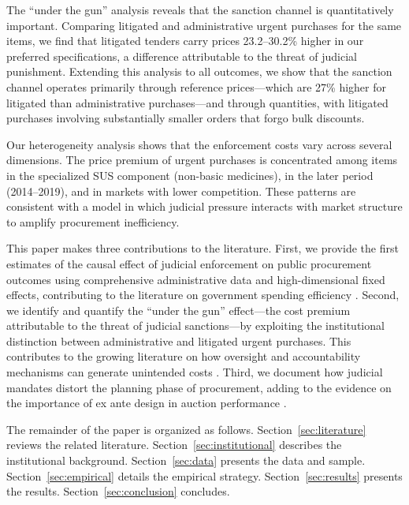 The ``under the gun'' analysis reveals that the sanction channel is quantitatively important. Comparing litigated and administrative urgent purchases for the same items, we find that litigated tenders carry prices 23.2--30.2\% higher in our preferred specifications, a difference attributable to the threat of judicial punishment. Extending this analysis to all outcomes, we show that the sanction channel operates primarily through reference prices---which are 27\% higher for litigated than administrative purchases---and through quantities, with litigated purchases involving substantially smaller orders that forgo bulk discounts.

Our heterogeneity analysis shows that the enforcement costs vary across several dimensions. The price premium of urgent purchases is concentrated among items in the specialized SUS component (non-basic medicines), in the later period (2014--2019), and in markets with lower competition. These patterns are consistent with a model in which judicial pressure interacts with market structure to amplify procurement inefficiency.

This paper makes three contributions to the literature. First, we provide the first estimates of the causal effect of judicial enforcement on public procurement outcomes using comprehensive administrative data and high-dimensional fixed effects, contributing to the literature on government spending efficiency \citep{bandiera2009active, best2023procurement, decarolis2018buyer}. Second, we identify and quantify the ``under the gun'' effect---the cost premium attributable to the threat of judicial sanctions---by exploiting the institutional distinction between administrative and litigated urgent purchases. This contributes to the growing literature on how oversight and accountability mechanisms can generate unintended costs \citep{rasul2018management, williams2021bureaucratic, duflo2018obligations}. Third, we document how judicial mandates distort the planning phase of procurement, adding to the evidence on the importance of ex ante design in auction performance \citep{coviello2018bidding, szucs2023competition, baltrunaite2021discretion}.

The remainder of the paper is organized as follows. Section~\ref{sec:literature} reviews the related literature. Section~\ref{sec:institutional} describes the institutional background. Section~\ref{sec:data} presents the data and sample. Section~\ref{sec:empirical} details the empirical strategy. Section~\ref{sec:results} presents the results. Section~\ref{sec:conclusion} concludes.

